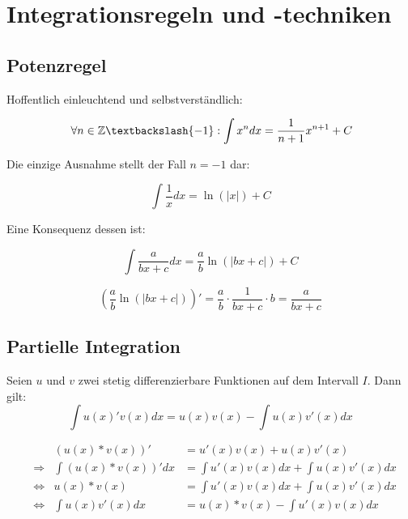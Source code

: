 \documentclass[main.tex]{subfiles}
\begin{document}
\section{Integrationsregeln und -techniken}

\subsection{Potenzregel}
Hoffentlich einleuchtend und selbstverständlich:
\begin{Theorem}
  $$\A n \in \Z \textbackslash \{ -1\}:\int  x^n dx = \frac{1}{n+1}x^{n+1} + C$$
\end{Theorem}

\begin{Bemerkung}
  Die einzige Ausnahme stellt der Fall $n=-1$ dar:
  \begin{Theorem}
    $$\int \dfrac{1}{x} dx = \ln(|x|) + C$$
  \end{Theorem}
\end{Bemerkung}

Eine Konsequenz dessen ist:

\begin{Theorem}
  $$\int \dfrac{a}{bx+c} dx = \dfrac{a}{b}\ln(|bx+c|) + C$$
\end{Theorem}

\begin{Beweis}
  $$\left ( \dfrac{a}{b}\ln(|bx+c|)\right )' = \dfrac{a}{b}\cdot \dfrac{1}{bx+c}\cdot b = \dfrac{a}{bx+c}$$
\end{Beweis}

\subsection{Partielle Integration}
\begin{Theorem}
  Seien $u$ und $v$ zwei stetig differenzierbare Funktionen auf dem Intervall $I$. Dann gilt:
  $$\int u(x)'v(x) dx= u(x)v(x) - \int u(x)v'(x) dx$$
\end{Theorem}

\begin{Beweis}
  \begin{align*}
    &&(u(x)*v(x))' &= u'(x)v(x)+u(x)v'(x)\\
    &\Rightarrow & \int (u(x)*v(x))' dx &= \int u'(x)v(x)dx+\int u(x)v'(x)dx\\
    &\Leftrightarrow & u(x)*v(x) &= \int u'(x)v(x)dx + \int u(x)v'(x)dx\\
    &\Leftrightarrow & \int u(x)v'(x)dx &= u(x)*v(x)- \int u'(x)v(x)dx\\
  \end{align*}
\end{Beweis}
\end{document}
